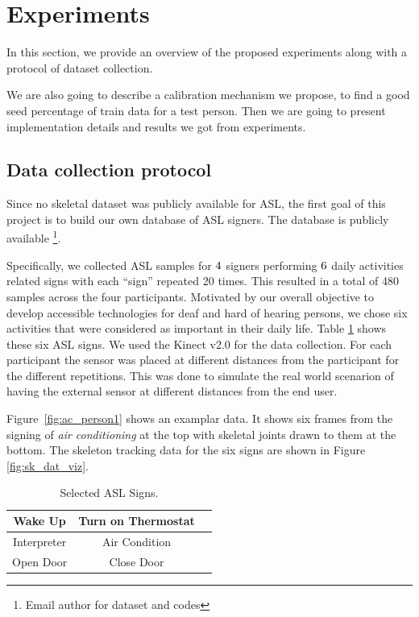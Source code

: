\documentclass[10pt,twocolumn,letterpaper]{article}
\begin{document}
\section{Experiments}
In this section, we provide an overview of the proposed experiments along with a protocol of dataset collection. 

We are also going to describe a calibration mechanism we propose, to find a good seed
percentage of train data for a test person. Then we are going to present implementation details and results we got from experiments. 

\subsection{Data collection protocol}

Since no skeletal dataset was publicly available for
ASL, the first goal of this project is to build our own 
database of ASL signers. The database is publicly available \footnote{Email author for dataset and codes}.



Specifically, we collected  ASL samples 
for $\number4$ signers performing 
  $\number6$ daily activities related signs with each ``sign'' repeated 20 times. This resulted in a total of 480 samples 
  across the four participants. Motivated by our overall objective to develop
  accessible technologies for deaf and hard of hearing persons, we chose 
  six activities that were considered as important in their daily life. Table \ref{table:asl_signs} 
  shows these six ASL signs. We used the Kinect v2.0 for the data collection. For each participant 
the sensor was placed at different distances from the participant for the 
different repetitions. This was done to simulate the real world scenarion of having the external sensor 
at different distances from the end user. 

Figure~\ref{fig:ac_person1} shows an examplar data. It shows six frames from the signing of 
\textit{air conditioning} at the top with 
skeletal joints drawn  to them at the bottom.  The skeleton tracking data for the six signs 
are shown in Figure \ref{fig:sk_dat_viz}.


\begin{table}[h]
	\begin{center}
		\begin{tabular}{|c|c|c}
			\hline
			Wake Up & Turn on Thermostat\\
			\hline
			Interpreter & Air Condition\\
			\hline
			Open Door & Close Door\\
			\hline
		\end{tabular}
	\end{center}
	\caption{Selected ASL Signs.}
	\label{table:asl_signs}
\end{table}
\end{document}
